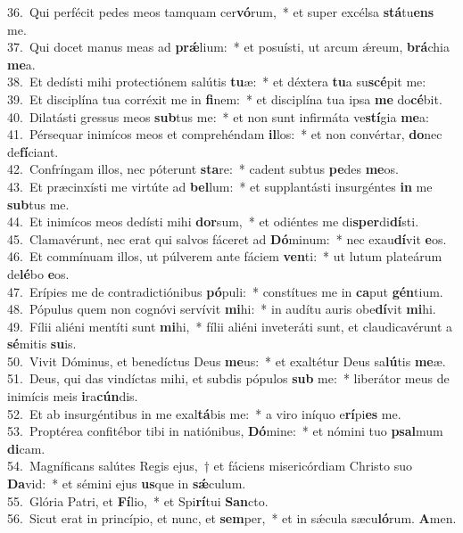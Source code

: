 {36.~}Qui perfécit pedes meos tamquam cer\textbf{vó}rum,~* et super excélsa \textbf{stá}tu\textbf{ens} me.\\
{37.~}Qui docet manus meas ad \textbf{prǽ}lium:~* et posuísti, ut arcum ǽreum, \textbf{brá}chia \textbf{me}a.\\
{38.~}Et dedísti mihi protectiónem salútis \textbf{tu}æ:~* et déxtera \textbf{tu}a su\textbf{scé}pit me:\\
{39.~}Et disciplína tua corréxit me in \textbf{fi}nem:~* et disciplína tua ipsa \textbf{me} do\textbf{cé}bit.\\
{40.~}Dilatásti gressus meos \textbf{sub}tus me:~* et non sunt infirmáta ve\textbf{stí}gia \textbf{me}a:\\
{41.~}Pérsequar inimícos meos et comprehéndam \textbf{il}los:~* et non convértar, \textbf{do}nec de\textbf{fí}ciant.\\
{42.~}Confríngam illos, nec póterunt \textbf{sta}re:~* cadent subtus \textbf{pe}des \textbf{me}os.\\
{43.~}Et præcinxísti me virtúte ad \textbf{bel}lum:~* et supplantásti insurgéntes \textbf{in} me \textbf{sub}tus me.\\
{44.~}Et inimícos meos dedísti mihi \textbf{dor}sum,~* et odiéntes me di\textbf{sper}di\textbf{dí}sti.\\
{45.~}Clamavérunt, nec erat qui salvos fáceret ad \textbf{Dó}minum:~* nec exau\textbf{dí}vit \textbf{e}os.\\
{46.~}Et commínuam illos, ut púlverem ante fáciem \textbf{ven}ti:~* ut lutum plateárum de\textbf{lé}bo \textbf{e}os.\\
{47.~}Erípies me de contradictiónibus \textbf{pó}puli:~* constítues me in \textbf{ca}put \textbf{gén}tium.\\
{48.~}Pópulus quem non cognóvi servívit \textbf{mi}hi:~* in audítu auris obe\textbf{dí}vit \textbf{mi}hi.\\
{49.~}Fílii aliéni mentíti sunt \textbf{mi}hi,~* fílii aliéni inveteráti sunt, et claudicavérunt a \textbf{sé}mitis \textbf{su}is.\\
{50.~}Vivit Dóminus, et benedíctus Deus \textbf{me}us:~* et exaltétur Deus sa\textbf{lú}tis \textbf{me}æ.\\
{51.~}Deus, qui das vindíctas mihi, et subdis pópulos \textbf{sub} me:~* liberátor meus de inimícis meis \textbf{i}ra\textbf{cún}dis.\\
{52.~}Et ab insurgéntibus in me exal\textbf{tá}bis me:~* a viro iníquo e\textbf{rí}pi\textbf{es} me.\\
{53.~}Proptérea confitébor tibi in natiónibus, \textbf{Dó}mine:~* et nómini tuo \textbf{psal}mum \textbf{di}cam.\\
{54.~}Magníficans salútes Regis ejus,~† et fáciens misericórdiam Christo suo \textbf{Da}vid:~* et sémini ejus \textbf{us}que in \textbf{sǽ}culum.\\
{55.~}Glória Patri, et \textbf{Fí}lio,~* et Spi\textbf{rí}tui \textbf{San}cto.\\
{56.~}Sicut erat in princípio, et nunc, et \textbf{sem}per,~* et in sǽcula sæcu\textbf{ló}rum. \textbf{A}men.\\
